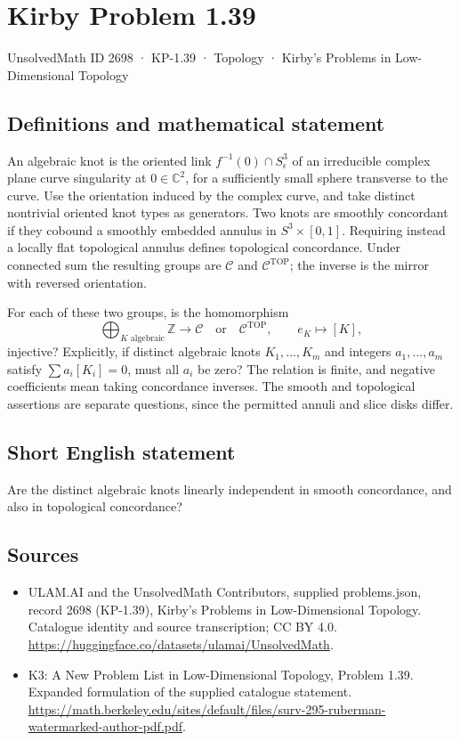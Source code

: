 \documentclass[11pt,a4paper]{article}
\begin{document}
\section*{Kirby Problem 1.39}\label{2698}
{\small UnsolvedMath ID 2698 · KP-1.39 · Topology · Kirby's Problems in Low-Dimensional Topology}
\subsection{Definitions and mathematical statement}
An algebraic knot is the oriented link $f^{-1}(0)\cap S^3_\epsilon$ of an
irreducible complex plane curve singularity at $0\in\mathbb C^2$, for a sufficiently
small sphere transverse to the curve. Use the orientation induced by the complex
curve, and take distinct nontrivial oriented knot types as generators.
Two knots are smoothly concordant if they cobound a smoothly embedded annulus
in $S^3\times[0,1]$. Requiring instead a locally flat topological annulus defines
topological concordance. Under connected sum the resulting groups are
$\mathcal C$ and $\mathcal C^{\mathrm{TOP}}$; the inverse is the mirror with
reversed orientation.

For each of these two groups, is the homomorphism
\[
\bigoplus_{K\text{ algebraic}}\mathbb Z\longrightarrow\mathcal C
\quad\text{or}\quad\mathcal C^{\mathrm{TOP}},\qquad e_K\longmapsto[K],
\]
injective? Explicitly, if distinct algebraic knots $K_1,\ldots,K_m$ and integers
$a_1,\ldots,a_m$ satisfy $\sum a_i[K_i]=0$, must all $a_i$ be zero?
The relation is finite, and negative coefficients mean taking concordance
inverses. The smooth and topological assertions are separate questions, since
the permitted annuli and slice disks differ.
\subsection{Short English statement}
Are the distinct algebraic knots linearly independent in smooth concordance, and also in topological concordance?
\subsection{Sources}
\begin{itemize}
\item[S1] ULAM.AI and the UnsolvedMath Contributors, supplied problems.json, record 2698 (KP-1.39), Kirby's Problems in Low-Dimensional Topology. Catalogue identity and source transcription; CC BY 4.0.
\url{https://huggingface.co/datasets/ulamai/UnsolvedMath}.
\item[S2] K3: A New Problem List in Low-Dimensional Topology, Problem 1.39. Expanded formulation of the supplied catalogue statement.
\url{https://math.berkeley.edu/sites/default/files/surv-295-ruberman-watermarked-author-pdf.pdf}.
\end{itemize}
\end{document}
